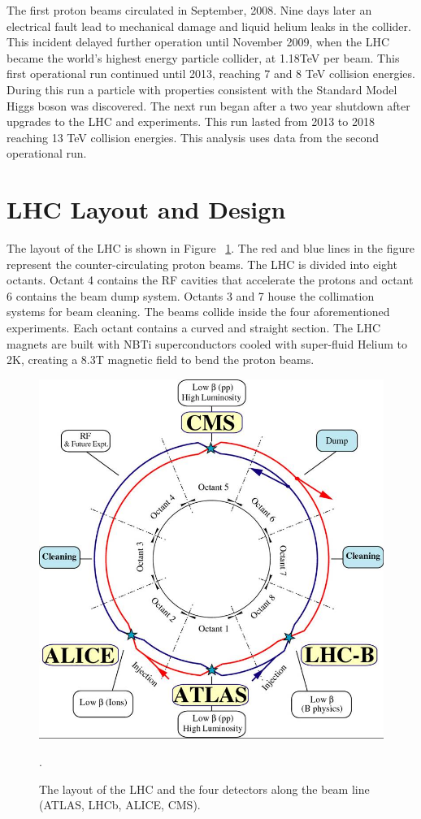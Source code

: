 The first proton beams circulated in September, 2008. Nine days later an electrical fault lead to mechanical damage and liquid helium leaks in the collider. This incident delayed further operation until November 2009, when the LHC became the world's highest energy particle collider, at 1.18TeV per beam. This first operational run continued until 2013, reaching 7 and 8 TeV collision energies. During this run a particle with properties consistent with the Standard Model Higgs boson was discovered. The next run began after a two year shutdown after upgrades to the LHC and experiments. This run lasted from 2013 to 2018 reaching 13 TeV collision energies. This analysis uses data from the second operational run. 
\section{LHC Layout and Design}
The layout of the LHC is shown in Figure ~\ref{fig:lhc_layout}. The red and blue lines in the figure represent the counter-circulating proton beams. The LHC is divided into eight octants.  Octant 4 contains the RF cavities that accelerate the protons and octant 6 contains the beam dump system. Octants 3 and 7 house the collimation systems for beam cleaning. The beams collide inside the four aforementioned experiments. Each octant contains a curved and straight section. The LHC magnets are built with NBTi superconductors cooled with super-fluid Helium to 2K, creating a 8.3T magnetic field to bend the proton beams.


\begin{figure}[h!]
  \centering
  \includegraphics[width=\hsize]{figures/Detector/lhc.jpg}
  \caption{The layout of the LHC and the four detectors along the beam line (ATLAS, LHCb, ALICE, CMS).}. 
  \label{fig:lhc_layout}
\end{figure}
\FloatBarrier


